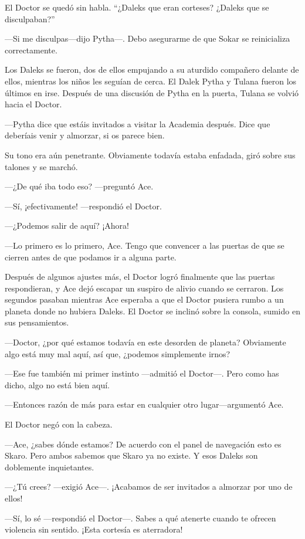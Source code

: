 El Doctor se quedó sin habla. ``¿Daleks que eran corteses?
¿Daleks que se disculpaban?''

---Si me disculpas---dijo Pytha---. Debo asegurarme de que
Sokar se reinicializa correctamente.

Los Daleks se fueron, dos de ellos empujando a su aturdido
compañero delante de ellos, mientras los niños les seguían de cerca. El
Dalek Pytha y Tulana fueron los últimos en irse. Después de una
discusión de Pytha en la puerta, Tulana se volvió hacia el Doctor.

---Pytha dice que estáis invitados a visitar la Academia
después. Dice que deberíais venir y almorzar, si os parece bien.

Su tono era aún penetrante. Obviamente todavía estaba enfadada,
giró sobre sus talones y se marchó.

---¿De qué iba todo eso? ---preguntó Ace.

---Sí, ¡efectivamente! ---respondió el Doctor.

---¿Podemos salir de aquí? ¡Ahora!

---Lo primero es lo primero, Ace. Tengo que convencer a las
puertas de que se cierren antes de que podamos ir a alguna parte.

Después de algunos ajustes más, el Doctor logró finalmente que
las puertas respondieran, y Ace dejó escapar un suspiro de alivio cuando
se cerraron. Los segundos pasaban mientras Ace esperaba a que el Doctor
pusiera rumbo a un planeta donde no hubiera Daleks. El Doctor se inclinó
sobre la consola, sumido en sus pensamientos.

---Doctor, ¿por qué estamos todavía en este desorden de planeta?
Obviamente algo está muy mal aquí, así que, ¿podemos simplemente irnos?

---Ese fue también mi primer instinto ---admitió el Doctor---.
Pero como has dicho, algo no está bien aquí.

---Entonces razón de más para estar en cualquier otro
lugar---argumentó Ace.

El Doctor negó con la cabeza.

---Ace, ¿sabes dónde estamos? De acuerdo con el panel de
navegación esto es Skaro. Pero ambos sabemos que Skaro ya no existe. Y
esos Daleks son doblemente inquietantes.

---¿Tú crees? ---exigió Ace---. ¡Acabamos de ser invitados a
almorzar por uno de ellos!

---Sí, lo sé ---respondió el Doctor---. Sabes a qué atenerte
cuando te ofrecen violencia sin sentido. ¡Esta cortesía es aterradora!

